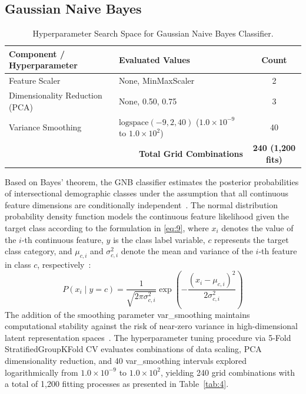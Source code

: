 \subsection{Gaussian Naive Bayes}
\label{sec:gaussian_naive_bayes}

\begin{table}[htbp]
\caption{Hyperparameter Search Space for Gaussian Naive Bayes Classifier.}
\label{tab:4}
\label{tab:IV}
\label{tab:gnb_params}
\centering
\footnotesize
\begin{tabular}{llc}
\toprule
Component / Hyperparameter & Evaluated Values & Count \\
\midrule
Feature Scaler & None, MinMaxScaler & 2 \\
Dimensionality Reduction (PCA) & None, 0.50, 0.75 & 3 \\
Variance Smoothing & $\text{logspace}(-9, 2, 40)$ ($1.0 \times 10^{-9}$ to $1.0 \times 10^{2}$) & 40 \\
\midrule
\multicolumn{2}{r}{\textbf{Total Grid Combinations}} & \textbf{240 (1,200 fits)} \\
\bottomrule
\end{tabular}
\end{table}

Based on Bayes' theorem, the GNB classifier estimates the posterior probabilities of intersectional demographic classes under the assumption that all continuous feature dimensions are conditionally independent~\cite{ref35}. The normal distribution probability density function models the continuous feature likelihood given the target class according to the formulation in \eqref{eq:9}, where $x_i$ denotes the value of the $i$-th continuous feature, $y$ is the class label variable, $c$ represents the target class category, and $\mu_{c,i}$ and $\sigma_{c,i}^2$ denote the mean and variance of the $i$-th feature in class $c$, respectively~\cite{ref35}:
\begin{equation}
P(x_i \mid y = c) = \frac{1}{\sqrt{2\pi\sigma_{c,i}^2}} \exp\left(-\frac{(x_i - \mu_{c,i})^2}{2\sigma_{c,i}^2}\right)
\label{eq:9}
\end{equation}
The addition of the smoothing parameter var\_smoothing maintains computational stability against the risk of near-zero variance in high-dimensional latent representation spaces~\cite{ref36}. The hyperparameter tuning procedure via 5-Fold StratifiedGroupKFold CV evaluates combinations of data scaling, PCA dimensionality reduction, and 40 var\_smoothing intervals explored logarithmically from $1.0 \times 10^{-9}$ to $1.0 \times 10^{2}$, yielding 240 grid combinations with a total of 1,200 fitting processes as presented in Table~\ref{tab:4}.
